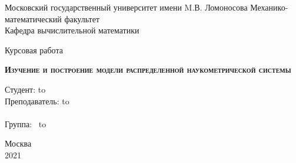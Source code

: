\begin{titlepage}
\newpage
\begin{center}
Московский государственный университет имени M.В. Ломоносова
Механико-математический факультет \\
Кафедра вычислительной математики \\
\end{center}

\vspace{8em}

\begin{center}
\Large Курсовая работа \\ 
\end{center}

\vspace{2em}

\begin{center}
\textsc{\textbf{Изучение и построение модели распределенной наукометрической системы}}
\end{center}

\vspace{24em}



\newbox{\lbox}
\newlength{\maxl}
\setlength{\maxl}{\wd\lbox}
\hfill\parbox{13cm}{
\hspace*{5cm}\hspace*{-5cm}Студент: \qquad\qquad\hbox to\\
\hspace*{5cm}\hspace*{-5cm}Преподаватель: \hbox to\\
\\
\hspace*{5cm}\hspace*{-5cm}Группа:\qquad\qquad $\;\:$ \hbox to\\
}


\vspace{\fill}

\begin{center}
Москва \\2021
\end{center}

\end{titlepage}
\newpage
